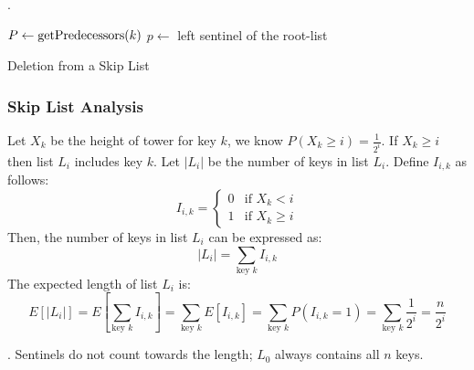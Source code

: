 \documentclass{article}
\begin{document}
\begin{codes}[].
    \begin{algorithm}[H]
        \SetAlgoLined
        \BlankLine
        $P \leftarrow \textnormal{getPredecessors}(k)$ \tcp*{\textcolor{orange}{Find predecessors of $k$}}
        $p \leftarrow$ left sentinel of the root-list \tcp*{\textcolor{orange}{Move to root-list}} 
        \caption{Deletion from a Skip List}
    \end{algorithm}
\end{codes}

\subsubsection{Skip List Analysis} 

Let $X_k$ be the height of tower for key $k$, we know $\displaystyle P(X_k \geq i) = \frac{1}{2^i}$. If $X_k \geq i$ then list $L_i$ includes key $k$.
Let $|L_i|$ be the number of keys in list $L_i$. Define $I_{i, k}$ as follows:
\[ I_{i, k} = \begin{cases} 
    0 & \text{if } X_k < i \\ 
    1 & \text{if } X_k \geq i 
\end{cases} \]
Then, the number of keys in list $L_i$ can be expressed as:
\[ |L_i| = \sum_{\text{key } k} I_{i, k} \]
The expected length of list $L_i$ is:
\[ E[|L_i|] = E\left[\sum_{\text{key } k} I_{i, k}\right] = \sum_{\text{key } k} E[I_{i, k}] = \sum_{\text{key } k} P(I_{i, k} = 1) = \sum_{\text{key } k} \frac{1}{2^i} = \frac{n}{2^i} \]

\begin{comm}[].
    Sentinels do not count towards the length; $L_0$ always contains all $n$ keys. 
\end{comm}
\end{document}
